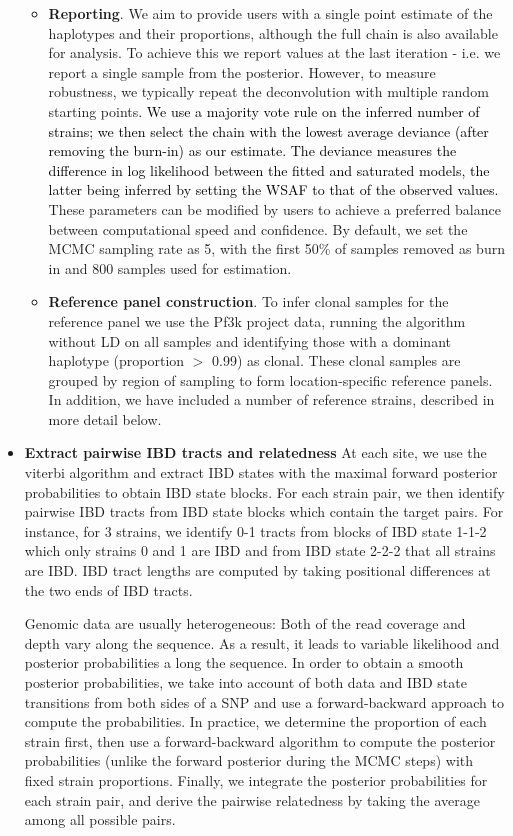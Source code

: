 \documentclass[9pt]{article}
\newcounter{todocounter}
\newcommand{\done}[2][]
{\todo[color=green!40, #1]{#2}}
\newcommand{\donenum}[2][]
{\stepcounter{todocounter}\done[#1]{\thetodocounter: #2}}
\begin{document}
\begin{itemize}
\begin{itemize}
\item {\bf Reporting}. We aim to provide users with a single point estimate of the haplotypes and their proportions, although the full chain is also available for analysis.  To achieve this we report values at the last iteration - i.e. we report a single sample from the posterior.  However, to measure robustness, we typically repeat the deconvolution with multiple random starting points\textcolor{black}{. We use a majority vote rule on the inferred number of strains; we then select the chain with the lowest average deviance (after removing the burn-in) as our estimate. The deviance measures the difference in log likelihood between the fitted and saturated models, the latter being inferred by setting the WSAF to that of the observed values.} These parameters can be modified by users to achieve a preferred balance between computational speed and confidence.  By default, we set the MCMC sampling rate as 5, with the first 50\% of samples removed as burn in and 800 samples used for estimation.

\item {\bf Reference panel construction}. To infer clonal samples for the reference panel we use the Pf3k project data, running the algorithm without LD on all samples and identifying those with a dominant haplotype (proportion $>$ 0.99) as clonal.  These clonal samples are grouped by region of sampling to form location-specific reference panels.  In addition, we have included a number of reference strains, described in more detail below.

\end{itemize}

\item {\bf Extract pairwise IBD tracts and relatedness}
\donenum{pairwise IBD tracts and relatedness}
At each site, we use the viterbi algorithm and  extract IBD states with the maximal forward posterior probabilities to obtain IBD state blocks. For each strain pair, we then identify pairwise IBD tracts from IBD state blocks which contain the target pairs. For instance, for 3 strains, we identify 0-1 tracts from blocks of IBD state 1-1-2 which only strains 0 and 1 are IBD and from IBD state 2-2-2 that all strains are IBD. IBD tract lengths are computed by taking positional differences at the two ends of IBD tracts.

Genomic data are usually heterogeneous: Both of the read coverage and depth vary along the sequence. As a result, it leads to variable likelihood and posterior probabilities a long the sequence. In order to obtain a smooth posterior probabilities, we take into account of both data and IBD state transitions from both sides of a SNP and use a forward-backward approach to compute the probabilities. In practice, we determine the proportion of each strain first, then use a forward-backward algorithm to compute the posterior probabilities (unlike the forward posterior during the MCMC steps) with fixed strain proportions. Finally, we integrate the posterior probabilities for each strain pair, and derive the pairwise relatedness by taking the average among all possible pairs.
\end{itemize}
\end{document}
